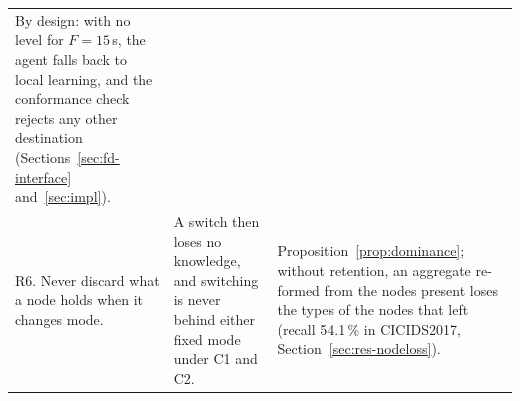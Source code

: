 \begin{table}[t]
\begin{tabular}{@{}p{}p{}p{}@{}}
By design: with no level for $F=15$\,s, the agent falls back to local learning, and the conformance check rejects any other destination (Sections~\ref{sec:fd-interface} and~\ref{sec:impl}). \\
R6. Never discard what a node holds when it changes mode. &
A switch then loses no knowledge, and switching is never behind either fixed mode under C1 and C2. &
Proposition~\ref{prop:dominance}; without retention, an aggregate re-formed from the nodes present loses the types of the nodes that left (recall 54.1\,\% in CICIDS2017, Section~\ref{sec:res-nodeloss}). \\
\bottomrule
\end{tabular}
\end{table}
